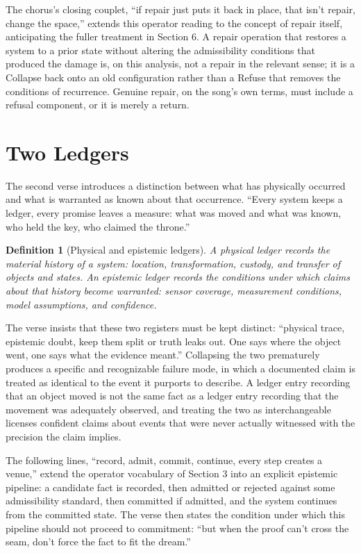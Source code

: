 \documentclass[11pt]{article}
\newtheorem{definition}{Definition}[section]
\begin{document}
The chorus's closing couplet, ``if repair just puts it back in place, that isn't repair, change the space,'' extends this operator reading to the concept of repair itself, anticipating the fuller treatment in Section 6. A repair operation that restores a system to a prior state without altering the admissibility conditions that produced the damage is, on this analysis, not a repair in the relevant sense; it is a Collapse back onto an old configuration rather than a Refuse that removes the conditions of recurrence. Genuine repair, on the song's own terms, must include a refusal component, or it is merely a return.

\section{Two Ledgers}

The second verse introduces a distinction between what has physically occurred and what is warranted as known about that occurrence. ``Every system keeps a ledger, every promise leaves a measure: what was moved and what was known, who held the key, who claimed the throne.''

\begin{definition}[Physical and epistemic ledgers]
A physical ledger records the material history of a system: location, transformation, custody, and transfer of objects and states. An epistemic ledger records the conditions under which claims about that history become warranted: sensor coverage, measurement conditions, model assumptions, and confidence.
\end{definition}

The verse insists that these two registers must be kept distinct: ``physical trace, epistemic doubt, keep them split or truth leaks out. One says where the object went, one says what the evidence meant.'' Collapsing the two prematurely produces a specific and recognizable failure mode, in which a documented claim is treated as identical to the event it purports to describe. A ledger entry recording that an object moved is not the same fact as a ledger entry recording that the movement was adequately observed, and treating the two as interchangeable licenses confident claims about events that were never actually witnessed with the precision the claim implies.

The following lines, ``record, admit, commit, continue, every step creates a venue,'' extend the operator vocabulary of Section 3 into an explicit epistemic pipeline: a candidate fact is recorded, then admitted or rejected against some admissibility standard, then committed if admitted, and the system continues from the committed state. The verse then states the condition under which this pipeline should not proceed to commitment: ``but when the proof can't cross the seam, don't force the fact to fit the dream.''
\end{document}

